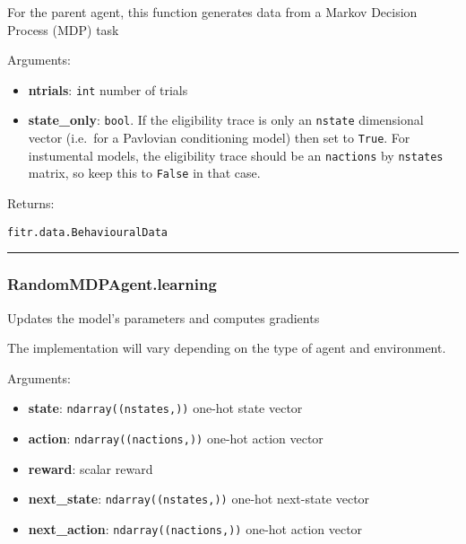 For the parent agent, this function generates data from a Markov
Decision Process (MDP) task

Arguments:

\begin{itemize}
\tightlist
\item
  \textbf{ntrials}: \texttt{int} number of trials
\item
  \textbf{state\_only}: \texttt{bool}. If the eligibility trace is only
  an \texttt{nstate} dimensional vector (i.e.~for a Pavlovian
  conditioning model) then set to \texttt{True}. For instumental models,
  the eligibility trace should be an \texttt{nactions} by
  \texttt{nstates} matrix, so keep this to \texttt{False} in that case.
\end{itemize}

Returns:

\texttt{fitr.data.BehaviouralData}

\begin{center}\rule{0.5\linewidth}{\linethickness}\end{center}

\subsubsection{RandomMDPAgent.learning}\label{randommdpagent.learning}

\begin{Shaded}
\begin{Highlighting}[]
\end{Highlighting}
\end{Shaded}

Updates the model's parameters and computes gradients

The implementation will vary depending on the type of agent and
environment.

Arguments:

\begin{itemize}
\tightlist
\item
  \textbf{state}: \texttt{ndarray((nstates,))} one-hot state vector
\item
  \textbf{action}: \texttt{ndarray((nactions,))} one-hot action vector
\item
  \textbf{reward}: scalar reward
\item
  \textbf{next\_state}: \texttt{ndarray((nstates,))} one-hot next-state
  vector
\item
  \textbf{next\_action}: \texttt{ndarray((nactions,))} one-hot action
  vector
\end{itemize}

